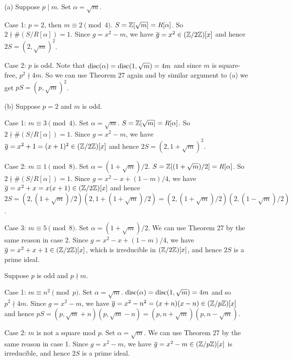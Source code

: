 \documentclass[../Marcus.tex]{subfiles}
\begin{document}
(a) Suppose $p\mid m$. Set $\alpha=\sqrt{m}$. 

Case 1: $p=2$, then $m\equiv 2 \pmod{4}$. $S=\mathbb{Z}[\sqrt{m}]=R[\alpha]$. So $2\nmid \#(S/R[\alpha])=1$. Since $g=x^2-m$, we have $\overline{g}=x^2\in(\mathbb{Z}/2\mathbb{Z})[x]$ and hence $2S=(2,\sqrt{m})^2$.

Case 2: $p$ is odd. Note that $\operatorname{disc}(\alpha)=\operatorname{disc}(1,\sqrt{m})=4m$ and since $m$ is square-free, $p^2\nmid 4m$. So we can use Theorem 27 again and by similar argument to (a) we get $pS=(p,\sqrt{m})^2$.

(b) Suppose $p=2$ and $m$ is odd.

Case 1: $m\equiv3\pmod{4}$. Set $\alpha=\sqrt{m}$. $S=\mathbb{Z}[\sqrt{m}]=R[\alpha]$. So $2\nmid \#(S/R[\alpha])=1$. Since $g=x^2-m$, we have $\overline{g}=x^2+1=(x+1)^2\in(\mathbb{Z}/2\mathbb{Z})[x]$ and hence $2S=(2,1+\sqrt{m})^2$.

Case 2: $m\equiv1\pmod{8}$. Set $\alpha=(1+\sqrt{m})/2$. $S=\mathbb{Z}[(1+\sqrt{m})/2]=R[\alpha]$. So $2\nmid \#(S/R[\alpha])=1$. Since $g=x^2-x+(1-m)/4$, we have $\overline{g}=x^2+x=x(x+1)\in(\mathbb{Z}/2\mathbb{Z})[x]$ and hence $2S=(2,(1+\sqrt{m})/2)(2,1+(1+\sqrt{m})/2)=(2,(1+\sqrt{m})/2)(2,(1-\sqrt{m})/2)$.

Case 3: $m\equiv5\pmod{8}$. Set $\alpha=(1+\sqrt{m})/2$. We can use Theorem 27 by the same reason in case 2. Since $g=x^2-x+(1-m)/4$, we have $\overline{g}=x^2+x+1\in(\mathbb{Z}/2\mathbb{Z})[x]$, which is irreducible in $(\mathbb{Z}/2\mathbb{Z})[x]$, and hence $2S$ is a prime ideal.

Suppose $p$ is odd and $p\nmid m$.

Case 1: $m\equiv n^2\pmod{p}$. Set $\alpha=\sqrt{m}$. $\operatorname{disc}(\alpha)=\operatorname{disc}(1,\sqrt{m})=4m$ and so $p^2\nmid 4m$. Since $g=x^2-m$, we have $\overline{g}=x^2-n^2=(x+n)(x-n)\in(\mathbb{Z}/p\mathbb{Z})[x]$ and hence $pS=(p,\sqrt{m}+n)(p,\sqrt{m}-n)=(p,n+\sqrt{m})(p,n-\sqrt{m})$.

Case 2: $m$ is not a square mod $p$. Set $\alpha=\sqrt{m}$. We can use Theorem 27 by the same reason in case 1. Since $g=x^2-m$, we have $\overline{g}=x^2-m\in(\mathbb{Z}/p\mathbb{Z})[x]$ is irreducible, and hence $2S$ is a prime ideal.
\end{document}
